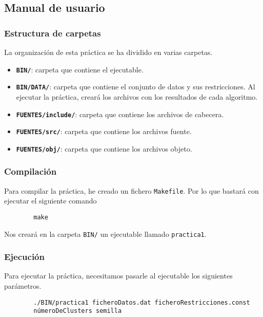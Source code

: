 	\subsection{Manual de usuario}
		\subsubsection{Estructura de carpetas}
			La organización de esta práctica se ha dividido en varias carpetas.
			
			\begin{itemize}
				\item \textbf{\lstinline!BIN/!}: carpeta que contiene el ejecutable.
				\item \textbf{\lstinline!BIN/DATA/!}: carpeta que contiene el conjunto de datos y sus restricciones.
				Al ejecutar la práctica, creará los archivos con los resultados de cada algoritmo.
				\item \textbf{\lstinline!FUENTES/include/!}: carpeta que contiene los archivos de cabecera.
				\item \textbf{\lstinline!FUENTES/src/!}: carpeta que contiene los archivos fuente.
				\item \textbf{\lstinline!FUENTES/obj/!}: carpeta que contiene los archivos objeto.
			\end{itemize}

		\subsubsection{Compilación}
			Para compilar la práctica, he creado un fichero \lstinline!Makefile!. Por lo que bastará con ejecutar el siguiente comando
		
		\footnotesize
		\begin{lstlisting}
		make
		\end{lstlisting}
		\normalsize

			Nos creará en la carpeta \lstinline!BIN/! un ejecutable llamado \lstinline!practica1!.

		\subsubsection{Ejecución}
			Para ejecutar la práctica, necesitamos pasarle al ejecutable los siguientes parámetros.

		\footnotesize
		\begin{lstlisting}
		./BIN/practica1 ficheroDatos.dat ficheroRestricciones.const 
		númeroDeClusters semilla
		\end{lstlisting}
		\normalsize

